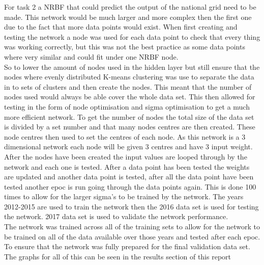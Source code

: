 \documentclass{IEEEtran}[11pt]
\begin{document}
\begin{flushleft}
  For task 2 a NRBF that could predict the output of the national grid need to be made.
  This network would be much larger and more complex then the first one due to the fact that more
  data points would exist. When first creating and testing the network a node was used for each
  data point to check that every thing was working correctly, but this was not the best practice
  as some data points where very similar and could fit under one NRBF node.
  \\
  \vspace{2.5mm}
  So to lower the amount of nodes used in the hidden layer but still ensure that the nodes where
  evenly distributed K-means clustering was use to separate the data in to sets of clusters and then
  create the nodes. This meant that the number of nodes used would always be able cover the whole data set.
  This then allowed for testing in the form of node optimisation and sigma optimisation to get a much more
  efficient network. To get the number of nodes the total size of the data set is divided by a set number
  and that many nodes centres are then created. These node centres then used to set the centres of each node.
  As this network is a 3 dimensional network each node will be given 3 centres and have 3 input weight.
  \\
  \vspace{2.5mm}
  After the nodes have been created the input values are looped through by the network and each one is tested.
  After a data point has been tested the weights are updated and another data point is tested, after all the data point
  have been tested another epoc is run going through the data points again. This is done 100 times to allow
  for the larger sigma's to be trained by the network. The years 2012-2015 are used to train the network then the 2016
  data set is used for testing the network. 2017 data set is used to validate the network performance.
  \\
  \vspace{2.5mm}
  The network was trained across all of the training sets to allow for the network to be trained on all of the data
  available over those years and tested after each epoc. To ensure that the network was fully prepared for the
  final validation data set.
  \\
  \vspace{1.5mm}
  The graphs for all of this can be seen in the results section of this report

\end{flushleft}
\end{document}
